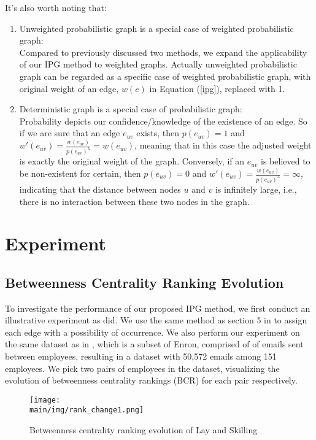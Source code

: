 \documentclass[\main/thesis.tex]{subfiles}
\begin{document}
It's also worth noting that:
\begin{enumerate}
\item Unweighted probabilistic graph is a special case of weighted probabilistic graph:\\ 
Compared to previously discussed two methods, we expand the applicability of our IPG method to weighted graphs. Actually unweighted probabilistic graph can be regarded as a specific case of weighted probabilistic graph, with original weight of an edge, $w(e)$ in Equation (\ref{ipg}), replaced with 1.
\item Deterministic graph is a special case of probabilistic graph:\\
Probability depicts our confidence/knowledge of the existence of an edge. So if we are sure that an edge $e_{uv}$ exists, then $p(e_{uv}) = 1$ and $w'(e_{uv}) = \frac{w(e_{uv})}{p(e_{uv})^\lambda } = w(e_{uv})$, meaning that in this case the adjusted weight is exactly the original weight of the graph. Conversely, if an $e_{uv}$ is believed to be non-existent for certain, then $p(e_{uv}) = 0$ and $w'(e_{uv}) = \frac{w(e_{uv})}{p(e_{uv})^\lambda } = \infty$, indicating that the distance between nodes $u$ and $v$ is infinitely large, i.e., there is no interaction between these two nodes in the graph.
\end{enumerate}




\section{Experiment}
\subsection{Betweenness Centrality Ranking Evolution}
To investigate the performance of our proposed IPG method, we first conduct an illustrative experiment as \cite{pfeiffer2010probabilistic,pfeiffer2011methods} did. We use the same method as section 5 in \cite{pfeiffer2010probabilistic} to assign each edge with a possibility of occurrence. We also perform our experiment on the same dataset as in \cite{pfeiffer2010probabilistic,pfeiffer2011methods}, which is a subset of Enron, comprised of of emails sent between employees, resulting in a dataset with 50,572 emails among 151 employees. We pick two pairs of employees in the dataset, visualizing the evolution of betweenness centrality rankings (BCR) for each pair respectively. 
\begin{figure}
\centering
\texttt{[image: \\main/img/rank\_change1.png]}
\caption{Betweenness centrality ranking evolution of Lay and Skilling}
\label{rank_change1}
\end{figure}
\end{document}
